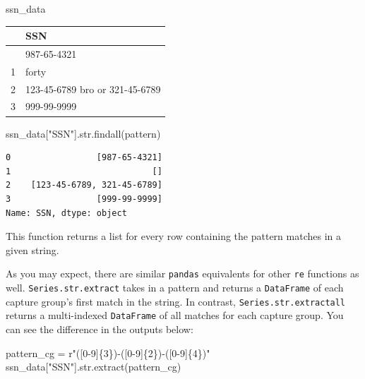 \documentclass[
  letterpaper,
  DIV=11,
  numbers=noendperiod]{scrreprt}
\newenvironment{Shaded}{\begin{snugshade}}{\end{snugshade}}
\newcommand{\BuiltInTok}[1]{\textcolor[rgb]{0.00,0.23,0.31}{#1}}
\newcommand{\NormalTok}[1]{\textcolor[rgb]{0.00,0.23,0.31}{#1}}
\newcommand{\OperatorTok}[1]{\textcolor[rgb]{0.37,0.37,0.37}{#1}}
\newcommand{\SpecialCharTok}[1]{\textcolor[rgb]{0.37,0.37,0.37}{#1}}
\newcommand{\StringTok}[1]{\textcolor[rgb]{0.13,0.47,0.30}{#1}}
\newcommand{\VerbatimStringTok}[1]{\textcolor[rgb]{0.13,0.47,0.30}{#1}}
\begin{document}
\begin{Shaded}
\begin{Highlighting}[]
\NormalTok{ssn\_data}
\end{Highlighting}
\end{Shaded}

\begin{longtable}[]{@{}ll@{}}
\toprule\noalign{}
& SSN \\
\midrule\noalign{}
\endhead
\bottomrule\noalign{}
\endlastfoot
0 & 987-65-4321 \\
1 & forty \\
2 & 123-45-6789 bro or 321-45-6789 \\
3 & 999-99-9999 \\
\end{longtable}

\begin{Shaded}
\begin{Highlighting}[]
\NormalTok{ssn\_data[}\StringTok{"SSN"}\NormalTok{].}\BuiltInTok{str}\NormalTok{.findall(pattern)}
\end{Highlighting}
\end{Shaded}

\begin{verbatim}
0                 [987-65-4321]
1                            []
2    [123-45-6789, 321-45-6789]
3                 [999-99-9999]
Name: SSN, dtype: object
\end{verbatim}

This function returns a list for every row containing the pattern
matches in a given string.

As you may expect, there are similar \texttt{pandas} equivalents for
other \texttt{re} functions as well. \texttt{Series.str.extract} takes
in a pattern and returns a \texttt{DataFrame} of each capture group's
first match in the string. In contrast, \texttt{Series.str.extractall}
returns a multi-indexed \texttt{DataFrame} of all matches for each
capture group. You can see the difference in the outputs below:

\begin{Shaded}
\begin{Highlighting}[]
\NormalTok{pattern\_cg }\OperatorTok{=} \VerbatimStringTok{r"([0{-}9]}\SpecialCharTok{\{3\}}\VerbatimStringTok{){-}([0{-}9]}\SpecialCharTok{\{2\}}\VerbatimStringTok{){-}([0{-}9]}\SpecialCharTok{\{4\}}\VerbatimStringTok{)"}
\NormalTok{ssn\_data[}\StringTok{"SSN"}\NormalTok{].}\BuiltInTok{str}\NormalTok{.extract(pattern\_cg)}
\end{Highlighting}
\end{Shaded}
\end{document}
